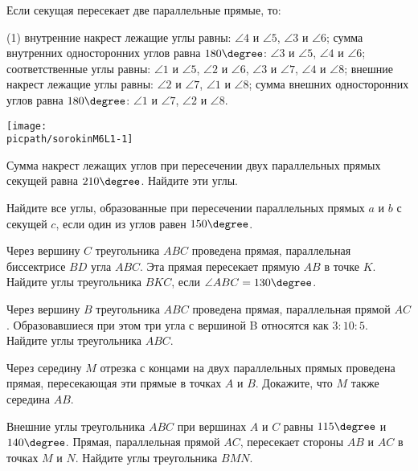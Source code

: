 %
%

\begin{class}[number=1]
	\begin{definit}
		Если секущая пересекает две параллельные прямые, то:
		\begin{tasks}(1)
			\task внутренние накрест лежащие углы равны: \( \angle 4 \) и \( \angle5 \), \( \angle 3 \) и \( \angle 6\);
			\task сумма внутренних односторонних углов равна  \(180\degree\): \( \angle 3 \) и \( \angle 5 \), \( \angle 4 \) и \( \angle 6 \);
			\task соответственные углы равны: \( \angle 1 \) и \( \angle 5 \), \( \angle 2 \) и \( \angle 6 \), \( \angle 3 \) и \( \angle 7 \), \( \angle 4 \) и \( \angle 8 \);
			\task внешние накрест лежащие углы равны: \( \angle 2 \) и \( \angle 7 \), \( \angle 1 \) и \( \angle 8 \);
			\task сумма внешних односторонних углов равна  \(180\degree\): \( \angle 1 \) и \( \angle 7 \), \( \angle 2 \) и \( \angle 8 \).
		\end{tasks}
		\begin{minipage}[c]{0.9\linewidth}
			\texttt{[image: \\picpath/sorokinM6L1-1]}
		\end{minipage}
	\end{definit}
	\begin{listofex}
		\item Сумма накрест лежащих углов при пересечении двух параллельных прямых секущей равна \(210 \degree \). Найдите эти углы.
		\item Найдите все углы, образованные при пересечении параллельных прямых \(a\) и \(b\) с секущей \(c\), если один из углов равен \( 150 \degree \).
		\item Через вершину \(C\) треугольника \(ABC\) проведена прямая, параллельная биссектрисе \(BD\) угла \(ABC\). Эта прямая пересекает прямую \(AB\) в точке \(K\). Найдите углы треугольника \(BKC\), если \(\angle ABC = 130 \degree\).
		\item Через вершину \(B\) треугольника \(ABC\) проведена прямая, параллельная прямой \(AC\). Образовавшиеся при этом три угла с вершиной B относятся как \(3 : 10 : 5\). Найдите углы треугольника \(ABC\).
		\item Через середину \(M\) отрезка с концами на двух параллельных прямых проведена прямая, пересекающая эти прямые в точках \(A\) и \(B\). Докажите, что \(M\) также середина \(AB\).
		\item Внешние углы треугольника \(ABC\) при вершинах \(A\) и \(C\) равны \(115\degree\) и \(140\degree \). Прямая, параллельная прямой \(AC\), пересекает стороны \(AB\) и \(AC\) в точках \(M\) и \(N\). Найдите углы треугольника \(BMN\).

\end{listofex}
\end{class}
